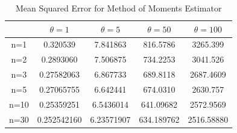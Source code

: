 \documentclass[12pt,letterpaper,titlepage,en-US]{article}
\begin{document}
\begin{table}[H]
\centering
\begin{tabular}{|c|c|c|c|c|}
\hline
& $\theta=1 $  &$\theta=5 $   &$\theta=50$    &$\theta=100$ \\\hline
n=1	&0.320539 	 &7.841863 	& 816.5786   &3265.399\\\hline
n=2	&	0.2893060 	&7.506875	&734.2253	&3041.526\\\hline
n=3	&0.27582063 	&6.867733	 &689.8118 	&2687.4609\\\hline
n=5	&0.27065755 	&6.642441	 &674.0310	&2630.757\\\hline
n=10	&0.25359251 	&6.5436014	 &641.09682	& 2572.9569\\\hline
n=30	&0.252542160 	&6.23571907	 &634.189762 	&2516.58880\\\hline
\end{tabular}
\caption{Mean Squared Error for Method of Moments Estimator}\label{1}
\end{table}
\end{document}
